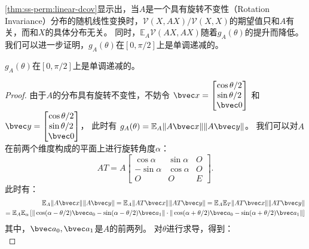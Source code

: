 \autoref{thm:ss-perm:linear-dcov}显示出，当$A$是一个具有旋转不变性（Rotation Invariance）分布的随机线性变换时，$\mathcal{V}(X, AX)/\mathcal{V}(X, X)$的期望值只和$A$有关，而和$X$的具体分布无关。
%
同时，$\mathbb E_A \mathcal{V}(AX, AX)$随着$g_A(\theta)$的提升而降低。
%
我们可以进一步证明，$g_A(\theta)$在$[0, \pi/2]$上是单调递减的。
%
\begin{proposition}
    $g_A(\theta)$在$[0, \pi/2]$上是单调递减的。
\end{proposition}
%
\begin{proof}
    由于$A$的分布具有旋转不变性，不妨令
    $\bvec x = \begin{bmatrix}
        \cos \theta/2 \\ \sin \theta/2 \\ \bvec 0   
    \end{bmatrix}$
    和
    $\bvec y = \begin{bmatrix}
        \cos \theta/2 \\ \sin \theta/2 \\ \bvec 0
    \end{bmatrix}$，
    此时有 $g_A(\theta) = \mathbb E_A \Vert A\bvec x\Vert \Vert A \bvec y\Vert$。
    我们可以对$A$在前两个维度构成的平面上进行旋转角度$\alpha$：
    \begin{equation}
        AT = A \begin{bmatrix}
            \cos \alpha & \sin \alpha & O \\
            -\sin \alpha &\cos \alpha & O \\
            O & O & E
        \end{bmatrix}.
    \end{equation}
    此时有：
    \begin{equation}
    \begin{split}
        \mathbb E_A \Vert A\bvec x \Vert \Vert A \bvec y \Vert = \mathbb E_A \Vert AT \bvec x \Vert \Vert AT \bvec y \Vert = \mathbb E_A \mathbb E_T \Vert AT \bvec x \Vert \Vert AT \bvec y \Vert \\
        = \mathbb E_A \mathbb E_\alpha 
        \left[
        \Vert \cos(\alpha - \theta/2)\bvec a_0 - \sin (\alpha - \theta/2) \bvec a_1\Vert 
        \cdot
        \Vert \cos(\alpha + \theta/2)\bvec a_0 - \sin (\alpha + \theta/2) \bvec a_1\Vert
        \right]
    \end{split}   
    \end{equation}
    其中，$\bvec a_0, \bvec a_1$是$A$的前两列。
    对$\theta$进行求导，得到：
    \begin{equation}

\end{equation}
\end{proof}
